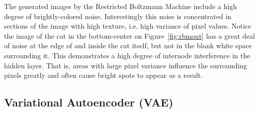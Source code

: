 \documentclass[%
 reprint,
 amsmath,amssymb,
 aps,
]{revtex4-2}
\begin{document}
The generated images by the Restricted Boltzmann Machine include a high degree of brightly-colored noise. Interestingly this noise is concentrated in sections of the image with high texture, i.e. high variance of pixel values. Notice the image of the cat in the bottom-center on Figure~\ref{fig:rbmout} has a great deal of noise at the edge of and inside the cat itself, but not in the blank white space surrounding it. This demonstrates a high degree of internode interference in the hidden layer. That is, areas with large pixel variance influence the surrounding pixels greatly and often cause bright spots to appear as a result.

\subsection{Variational Autoencoder (VAE)}
\end{document}
